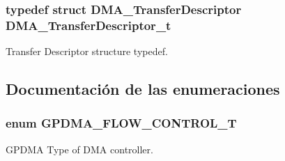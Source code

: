 \subsubsection[{\texorpdfstring{D\+M\+A\+\_\+\+Transfer\+Descriptor\+\_\+t}{DMA_TransferDescriptor_t}}]{\setlength{\rightskip}{0pt plus 5cm}typedef struct {\bf D\+M\+A\+\_\+\+Transfer\+Descriptor}  {\bf D\+M\+A\+\_\+\+Transfer\+Descriptor\+\_\+t}}\hypertarget{group___g_p_d_m_a__18_x_x__43_x_x_ga23dbdf610f0d1f61ae30a69944bbee55}{}\label{group___g_p_d_m_a__18_x_x__43_x_x_ga23dbdf610f0d1f61ae30a69944bbee55}


Transfer Descriptor structure typedef. 



\subsection{Documentación de las enumeraciones}
\subsubsection[{\texorpdfstring{G\+P\+D\+M\+A\+\_\+\+F\+L\+O\+W\+\_\+\+C\+O\+N\+T\+R\+O\+L\+\_\+T}{GPDMA_FLOW_CONTROL_T}}]{\setlength{\rightskip}{0pt plus 5cm}enum {\bf G\+P\+D\+M\+A\+\_\+\+F\+L\+O\+W\+\_\+\+C\+O\+N\+T\+R\+O\+L\+\_\+T}}\hypertarget{group___g_p_d_m_a__18_x_x__43_x_x_ga2cb59b641cd840f22780c44be1208133}{}\label{group___g_p_d_m_a__18_x_x__43_x_x_ga2cb59b641cd840f22780c44be1208133}


G\+P\+D\+MA Type of D\+MA controller. 

